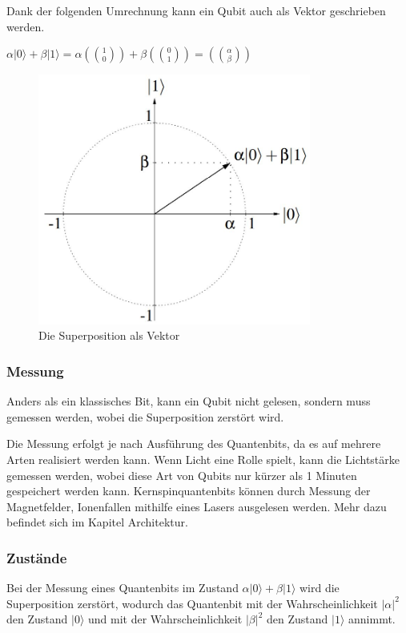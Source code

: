 Dank der folgenden Umrechnung kann ein Qubit auch als Vektor geschrieben werden.

$\alpha|0\rangle+\beta|1\rangle = \alpha(1\choose0)+\beta(0\choose1) = (\alpha \choose \beta)$

\begin{figure}[!htb]
	\centering\includegraphics[width=0.8\textwidth]{images/vektor.jpg}
	\caption{Die Superposition als Vektor}
	\label{vektor}
\end{figure}

\subsubsection{Messung}
\label{sec:bit_messung}

Anders als ein klassisches Bit, kann ein Qubit nicht gelesen, sondern muss gemessen werden, wobei die Superposition zerstört wird.

Die Messung erfolgt je nach Ausführung des Quantenbits, da es auf mehrere Arten realisiert werden kann. Wenn Licht eine Rolle spielt, kann die Lichtstärke gemessen werden, wobei diese Art von Qubits nur kürzer als 1 Minuten gespeichert werden kann. Kernspinquantenbits können durch Messung der Magnetfelder, Ionenfallen mithilfe eines Lasers ausgelesen werden. Mehr dazu befindet sich im Kapitel Architektur.

\subsubsection{Zustände}
\label{sec:zustaende}

Bei der Messung eines Quantenbits im Zustand $\alpha|0\rangle+\beta|1\rangle$ wird die Superposition zerstört, wodurch das Quantenbit mit der Wahrscheinlichkeit $|\alpha|^2$ den Zustand $|0\rangle$ und mit der Wahrscheinlichkeit $|\beta|^2$ den Zustand $|1\rangle$ annimmt.

